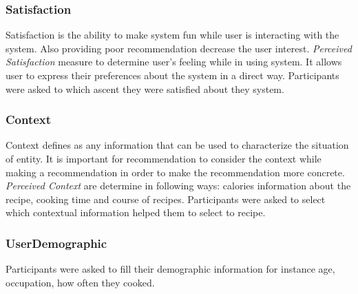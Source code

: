 \subsubsection{Satisfaction}
Satisfaction is the ability to make system fun while user is interacting with the system. Also providing poor recommendation decrease the user interest.\newline
\textit{Perceived Satisfaction} measure to determine user’s feeling while in using system. It allows user to express their preferences about the system in a direct way. Participants were asked to which ascent they were satisfied about they system.
\subsubsection{Context}
Context defines as any information that can be used to characterize the situation of entity. It is important for recommendation to consider the context while making a recommendation in order to make the recommendation more concrete. \newline
\textit{Perceived Context} are determine in following ways: calories information about the recipe, cooking time and course of recipes. Participants were asked to select which contextual information helped them to select to recipe. 
\subsubsection{UserDemographic}
Participants were asked to fill their demographic information for instance age, occupation, how often they cooked. 
